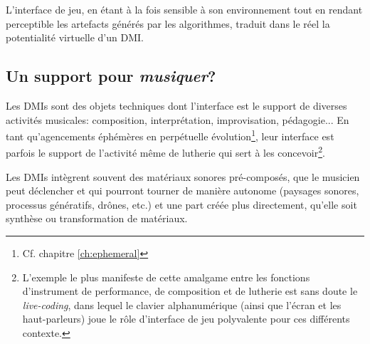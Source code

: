 \indent L'interface de jeu, en étant à la fois sensible à son environnement tout en rendant perceptible les artefacts générés par les algorithmes, traduit dans le réel la potentialité virtuelle d'un \gls{DMI}.


\subsection{Un support pour \textit{musiquer}?}

\noindent Les \glspl{DMI} sont des objets techniques dont l'interface est le support de diverses activités musicales: composition, interprétation, improvisation, pédagogie... En tant qu'agencements éphémères en perpétuelle évolution\footnote{Cf. chapitre \ref{ch:ephemeral}}, leur interface est parfois le support de l'activité même de lutherie qui sert à les concevoir\footnote{L'exemple le plus manifeste de cette amalgame entre les fonctions d'instrument de performance, de composition et de lutherie est sans doute le \textit{live-coding}, dans lequel le clavier alphanumérique (ainsi que l'écran et les haut-parleurs) joue le rôle d'interface de jeu polyvalente pour ces différents contexte.}.

\noindent Les \glspl{DMI} intègrent souvent des matériaux sonores pré-composés, que le musicien peut déclencher et qui pourront tourner de manière autonome (paysages sonores, processus génératifs, drônes, etc.) et une part créée plus directement, qu'elle soit synthèse ou transformation de matériaux.

